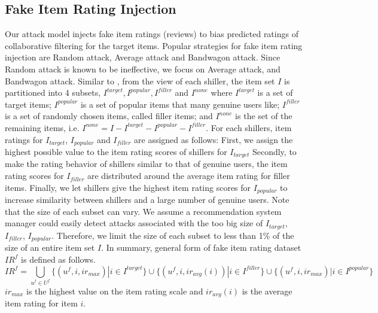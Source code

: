 \documentclass[master,english,final]{kaist-ucs}
\begin{document}
\subsection{Fake Item Rating Injection}
Our attack model injects fake item ratings (reviews) to bias predicted ratings of collaborative filtering for the target items.
Popular strategies for fake item rating injection are Random attack, Average attack and Bandwagon attack.
Since Random attack is known to be ineffective, we focus on Average attack, and Bandwagon attack.
Similar to \cite{shilling_attack_guide}, from the view of each shiller, the item set $I$ is partitioned into 4 subsets, $I^{target},I^{popular},I^{filler}$  and $I^{none}$ where $I^{target}$ is a set of target items; $I^{popular}$ is a set of popular items that many genuine users like; $I^{filler}$ is a set of randomly chosen items, called filler items; and $I^{none}$ is the set of the remaining items, i.e. $I^{none}=I-I^{target}-I^{popular}-I^{filler}$.
For each shillers, item ratings for $I_{target}$, $I_{popular}$ and $I_{filler}$ are assigned as follows:
First, we assign the highest possible value to the item rating scores of shillers for $I_{target}$
Secondly, to make the rating behavior of shillers similar to that of genuine users, the item rating scores for $I_{filler}$ are distributed around the average item rating for filler items.
Finally, we let shillers give the highest item rating scores for $I_{popular}$ to increase similarity between shillers and a large number of genuine users.
Note that the size of each subset can vary.
We assume a recommendation system manager could easily detect attacks associated with the too big size of $I_{target}$, $I_{filler}$, $I_{popular}$.
Therefore, we limit the size of each subset to less than 1\% of the size of an entire item set $I$.
In summary, general form of fake item rating dataset $IR^f$ is defined as follows.
\begin{equation}
{IR}^f = \bigcup_{u^f \in U^f} \{(u^f,i,ir_{max}) | i \in I^{target} \} \cup \{(u^f,i,ir_{avg} {(i)}) | i \in I^{filler} \} \cup \{(u^f,i,ir_{max}) | i \in I^{popular} \}
\end{equation}
$ir_{max}$ is the highest value on the item rating scale and $ir_{avg} {(i)}$ is the average item rating for item $i$.
\end{document}
